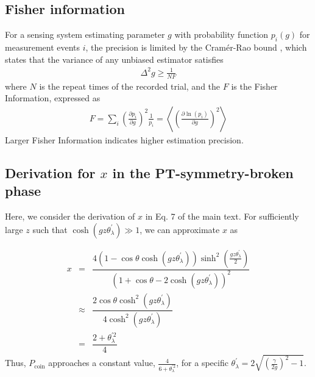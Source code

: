 \documentclass[%
reprint,
superscriptaddress,
amsthm,amsmath,amssymb,
aps,
]{revtex4-1}
\begin{document}
\subsection{\label{sec:level56}Fisher information }

For a sensing system estimating parameter $g$ with probability function $p_i(g)$ for measurement events $i$, the precision is limited by the Cramér-Rao bound \cite{kay1993fundamentals}, which states that the variance of any unbiased estimator satisfies
\begin{eqnarray} \Delta^2 g \geq \frac{1}{N F} \end{eqnarray}
where $N$ is the repeat times of the recorded trial, and the $F$ is the Fisher Information, expressed as
\begin{eqnarray} F = \sum_i \left( \frac{\partial p_i}{\partial g} \right)^2 \frac{1}{p_i} = \left\langle \left( \frac{\partial \ln(p_i)}{\partial g} \right)^2 \right\rangle \end{eqnarray}
Larger Fisher Information indicates higher estimation precision.



\subsection{\label{sec:level55}Derivation for $x$ in the PT-symmetry-broken phase}

Here, we consider the derivation of $x$ in Eq. 7 of the main text. For sufficiently large $z$ such that $\cosh (gz\theta^{'}_{\lambda})\gg1$, we can approximate $x$ as

\begin{eqnarray}
	x&=&\dfrac{4 \left( 1 - \cos \theta \cosh(gz \theta^{'}_{\lambda}) \right)\sinh^2 \left( \frac{gz \theta^{'}_{\lambda}}{2} \right) }{\left( 1 + \cos \theta - 2 \cosh(gz \theta^{'}_{\lambda}) \right)^2}\nonumber\\
	&\approx&\dfrac{2  \cos \theta \cosh^{2}(gz \theta^{'}_{\lambda})  }{4 \cosh^{2}(gz \theta^{'}_{\lambda}) }\nonumber\\
	&=&\dfrac{2+ \theta_{\lambda }^{'2} }{4}
\end{eqnarray}
Thus, $P_{\text{coin}}$ approaches a constant value, $ \frac{4}{6+ \theta_{\lambda }^{'2}}$, for a specific $\theta_{\lambda }^{'} = 2\sqrt{(\frac{\gamma}{2g})^{2}-1 } $.



	

	
	
	
	
	
	
	
\end{document}
